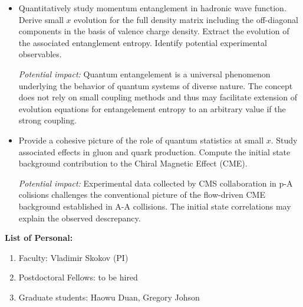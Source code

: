 \begin{itemize}
	\item Quantitatively study momentum entanglement in hadronic wave function. Derive 
		small $x$ evolution for the full density matrix including the off-diagonal components 
		in the basis of valence charge density. 
		Extract the evolution of the associated entanglement entropy. Identify potential 
		experimental observables. 

		{\it Potential impact:} Quantum entangelement is a universal phenomenon underlying 
		the behavior of quantum systems of diverse nature. The concept
		does not rely on small coupling methods and thus may facilitate extension of 
		evolution equations for entangelement entropy to an arbitrary value if the strong coupling.     
		

	\item Provide a cohesive picture of the role of quantum statistics at small $x$. 
		Study associated effects in gluon and quark production. Compute the initial state
		background contribution to the Chiral Magnetic Effect (CME). 
		
		{\it Potential impact:} Experimental data collected by CMS collaboration in p-A colisions
		challenges the conventional picture of the flow-driven CME background established in A-A
		collisions. The initial state correlations may explain the observed descrepancy.     


\end{itemize}

\vspace{0.5em}
\noindent
{\bf List of Personal:}
\begin{enumerate}
	\item Faculty: Vladimir Skokov (PI)
	\item Postdoctoral Fellows: to be hired 
	\item Graduate students:  Haowu Duan,  Gregory Johson 
\end{enumerate}

